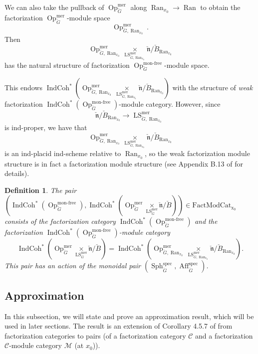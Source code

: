 \documentclass[10pt,a4paper]{amsart}
\newtheorem{defn}[subsubsection]{Definition}
\newcommand{\on}[1]{\operatorname{#1}}
\newcommand{\IndCoh}{\on{IndCoh}}
\newcommand{\Gcheck}{\check{G}}
\newcommand{\ncheck}{\check{\mathfrak{n}}}
\newcommand{\Bcheck}{\check{B}}
\newcommand{\Ran}{\on{Ran}}
\newcommand{\FactModCat}{\on{FactModCat_{x_0}}}
\newcommand{\sssec}[1]{\subsubsection{}}
\begin{document}
\sssec{}
We can also take the pullback of $\on{Op}_{\Gcheck}^{\on{mer}}$ along $\Ran_{x_0} \to \Ran$ to obtain the factorization $\on{Op}_{\Gcheck}^{\on{mer}}$-module space
$$
\on{Op}_{\Gcheck, \on{Ran}_{x_0}}^{\on{mer}}.
$$
Then
$$
\on{Op}_{\Gcheck, \on{Ran}_{x_0}}^{\on{mer}} \underset{\on{LS}_{\Gcheck, \on{Ran}_{x_0}}^{\on{mer}}}{\times} \ncheck/\Bcheck_{\Ran_{x_0}}
$$
has the natural structure of factorization $\on{Op}_{\Gcheck}^{\on{mon-free}}$-module space.

This endows $\on{IndCoh}^*(\on{Op}_{\Gcheck, \on{Ran}_{x_0}}^{\on{mer}} \underset{\on{LS}_{\Gcheck, \on{Ran}_{x_0}}^{\on{mer}}}{\times} \ncheck/\Bcheck_{\Ran_{x_0}})$ with the structure of \emph{weak} factorization $\IndCoh^*(\on{Op}_{\Gcheck}^{\on{mon-free}})$-module category. However, since 
$$
\ncheck/\Bcheck_{\Ran_{x_0}} \longrightarrow \on{LS}_{\Gcheck, \on{Ran}_{x_0}}^{\on{mer}}
$$
is ind-proper, we have that
$$
\on{Op}_{\Gcheck, \on{Ran}_{x_0}}^{\on{mer}} \underset{\on{LS}_{\Gcheck, \on{Ran}_{x_0}}^{\on{mer}}}{\times} \ncheck/\Bcheck_{\Ran_{x_0}}
$$
is an ind-placid ind-scheme relative to $\Ran_{x_0}$, so the weak factorization module structure is in fact a factorization module structure (see Appendix B.13 of \cite{GLC2} for details).

\begin{defn}
    The pair $(\IndCoh^*(\on{Op}_{\Gcheck}^{\on{mon-free}}), \IndCoh^*(\on{Op}_{\Gcheck}^{\on{mer}} \underset{\on{LS}_{\Gcheck}^{\on{mer}}}{\times} \ncheck/\Bcheck)) \in \FactModCat$ consists of the factorization category $\IndCoh^*(\on{Op}_{\Gcheck}^{\on{mon-free}})$ and the factorization $\IndCoh^*(\on{Op}_{\Gcheck}^{\on{mon-free}})$-module category
    $$
    \IndCoh^*(\on{Op}_{\Gcheck}^{\on{mer}} \underset{\on{LS}_{\Gcheck}^{\on{mer}}}{\times} \ncheck/\Bcheck) = \IndCoh^*(\on{Op}_{\Gcheck, \Ran_{x_0}}^{\on{mer}} \underset{\on{LS}_{\Gcheck, \Ran_{x_0}}^{\on{mer}}}{\times} \ncheck/\Bcheck_{\Ran_{x_0}}).
    $$
    This pair has an action of the monoidal pair $(\on{Sph}_{\Gcheck}^{\on{spec}}, \on{Aff}_{\Gcheck}^{\on{spec}})$.
\end{defn}


\subsection{Approximation} \label{Approximation}
In this subsection, we will state and prove an approximation result, which will be used in later sections. The result is an extension of Corollary 4.5.7 of \cite{GLC2} from factorization categories to pairs (of a factorization category $\mathcal{C}$ and a factorization $\mathcal{C}$-module category $\mathcal{M}$ (at $x_0$)).
\end{document}
